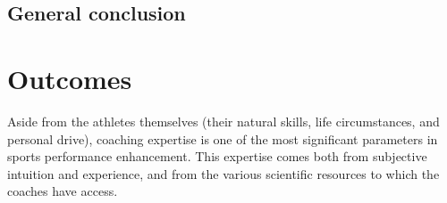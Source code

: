 

{} \mtcaddchapter
{}

\vspace*{-1cm}
\begin{flushright}
\section*{\fontsize{20pt}{20pt}\selectfont\textnormal{General conclusion}}
\end{flushright}
\vspace{2cm}

\chead[\fancyplain{}{}]
      {\fancyplain{}{}}
\lfoot[\fancyplain{}{}]
      {\fancyplain{}{}}
\cfoot[\fancyplain{}{\thepage}]
      {\fancyplain{}{\thepage}}
\rfoot[\fancyplain{}{}]
     {\fancyplain{}{\scriptsize}}


\section*{Outcomes}

Aside from the athletes themselves (their natural skills, life circumstances, and personal drive), coaching expertise is one of the most significant parameters in sports performance enhancement. This expertise comes both from subjective intuition and experience, and from the various scientific resources to which the coaches have access. 

